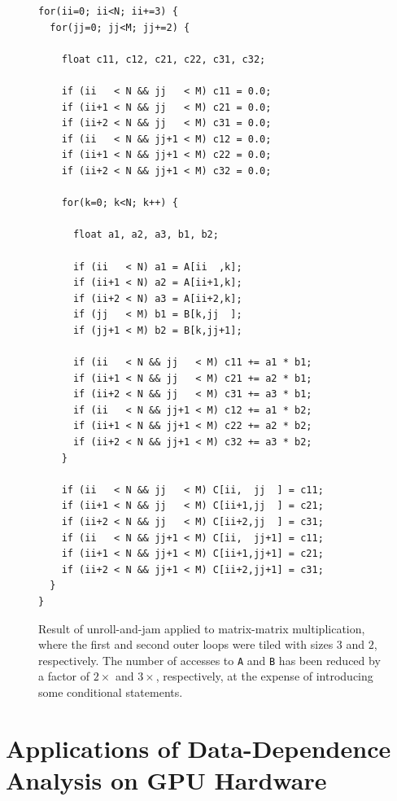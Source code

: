 \documentclass[acmsmall,review]{acmart}\settopmatter{printfolios=true,printccs=false,printacmref=false}
\begin{document}
\begin{figure}
\begin{lstlisting}[mathescape=true]
for(ii=0; ii<N; ii+=3) {
  for(jj=0; jj<M; jj+=2) {

    float c11, c12, c21, c22, c31, c32;

    if (ii   < N && jj   < M) c11 = 0.0;
    if (ii+1 < N && jj   < M) c21 = 0.0;
    if (ii+2 < N && jj   < M) c31 = 0.0;
    if (ii   < N && jj+1 < M) c12 = 0.0;    
    if (ii+1 < N && jj+1 < M) c22 = 0.0;
    if (ii+2 < N && jj+1 < M) c32 = 0.0;

    for(k=0; k<N; k++) {

      float a1, a2, a3, b1, b2;

      if (ii   < N) a1 = A[ii  ,k];
      if (ii+1 < N) a2 = A[ii+1,k];
      if (ii+2 < N) a3 = A[ii+2,k];
      if (jj   < M) b1 = B[k,jj  ];
      if (jj+1 < M) b2 = B[k,jj+1];
      
      if (ii   < N && jj   < M) c11 += a1 * b1;
      if (ii+1 < N && jj   < M) c21 += a2 * b1;
      if (ii+2 < N && jj   < M) c31 += a3 * b1;
      if (ii   < N && jj+1 < M) c12 += a1 * b2;
      if (ii+1 < N && jj+1 < M) c22 += a2 * b2;
      if (ii+2 < N && jj+1 < M) c32 += a3 * b2;
    }

    if (ii   < N && jj   < M) C[ii,  jj  ] = c11;
    if (ii+1 < N && jj   < M) C[ii+1,jj  ] = c21;
    if (ii+2 < N && jj   < M) C[ii+2,jj  ] = c31;
    if (ii   < N && jj+1 < M) C[ii,  jj+1] = c11;
    if (ii+1 < N && jj+1 < M) C[ii+1,jj+1] = c21;
    if (ii+2 < N && jj+1 < M) C[ii+2,jj+1] = c31;
  }
}
\end{lstlisting}\vspace{-2ex}
\caption{Result of unroll-and-jam applied to matrix-matrix multiplication, where the first and second outer loops were tiled with sizes $3$ and $2$, respectively. The number of accesses to {\tt A} and {\tt B} has been reduced by a factor of $2\times$ and $3\times$, respectively, at the expense of introducing some conditional statements.}
\label{fig-unroll-jam}
\end{figure}

\newpage
\section{Applications of Data-Dependence Analysis on GPU Hardware}
\label{subsec:apps}
\end{document}
